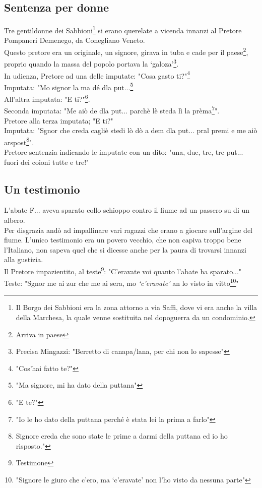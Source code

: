 \documentclass[10pt]{memoir} %
\begin{document}
\subsection{Sentenza per donne}
Tre gentildonne dei Sabbioni\footnote{Il Borgo dei Sabbioni era la zona attorno a via Saffi, dove vi era anche la villa della Marchesa, la quale venne sostituita nel dopoguerra da un condominio.} si erano querelate a vicenda innanzi al Pretore Pompaneri Demenego, da Conegliano Veneto.\\
Questo pretore era un originale, un signore, girava in tuba e cade per il paese\footnote{Arriva in paese}, proprio quando la massa del popolo portava la ‘galoza'\footnote{Precisa Mingazzi: "Berretto di canapa/lana, per chi non lo sapesse"}.\\
In udienza, Pretore ad una delle imputate: "Cosa gasto ti?"\footnote{"Cos'hai fatto te?"}\\
Imputata: "Mo signor la ma dé dla put...\footnote{"Ma signore, mi ha dato della puttana"}\\
All'altra imputata: "E ti?"\footnote{"E te?"}.\\
Seconda imputata: "Me aiò de dla put... parchè lè steda lì la prèma\footnote{"Io le ho dato della puttana perché è stata lei la prima a farlo"}".\\
Pretore alla terza imputata; "E ti?"\\
Imputata: "Sgnor che creda cagliè stedi lò dò a dem dla put... pral premi e me aiò arspost\footnote{Signore creda che sono state le prime a darmi della puttana ed io ho risposto."}".\\
Pretore sentenzia indicando le imputate con un dito: "una, due, tre, tre put... fuori dei coioni tutte e tre!"

\subsection{Un testimonio}
L'abate F\:.\:.\:. aveva sparato collo schioppo contro il fiume ad un passero su di un albero.\\
Per disgrazia andò ad impallinare vari ragazzi che erano a giocare sull'argine del fiume. L'unico testimonio era un povero vecchio, che non capiva troppo bene l'Italiano, non sapeva quel che si dicesse anche per la paura di trovarsi innanzi alla gustizia.	\\
Il Pretore impazientito, al teste\footnote{Testimone}: "C'eravate voi quanto l'abate ha sparato..."\\
Teste: "Sgnor me ai zur che me ai sera, mo \emph{‘c'eravate'} an lo visto in vitto\footnote{"Signore le giuro che c'ero, ma ‘c'eravate' non l'ho visto da nessuna parte"}"
\end{document}
